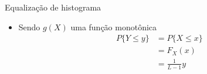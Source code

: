     \begin{slide}[toc=]{Equalização de histograma}
      \begin{itemize}
         \item Sendo $g(X)$ uma função monotônica
         \begin{align*}
             P\{Y\leq y\} &= P\{X\leq x\}\\
                          &= F_X(x)\\
                          &= \frac{1}{L-1}y
         \end{align*}\pause
         \begin{center}
         \end{center}
      \end{itemize}
   \end{slide}    

